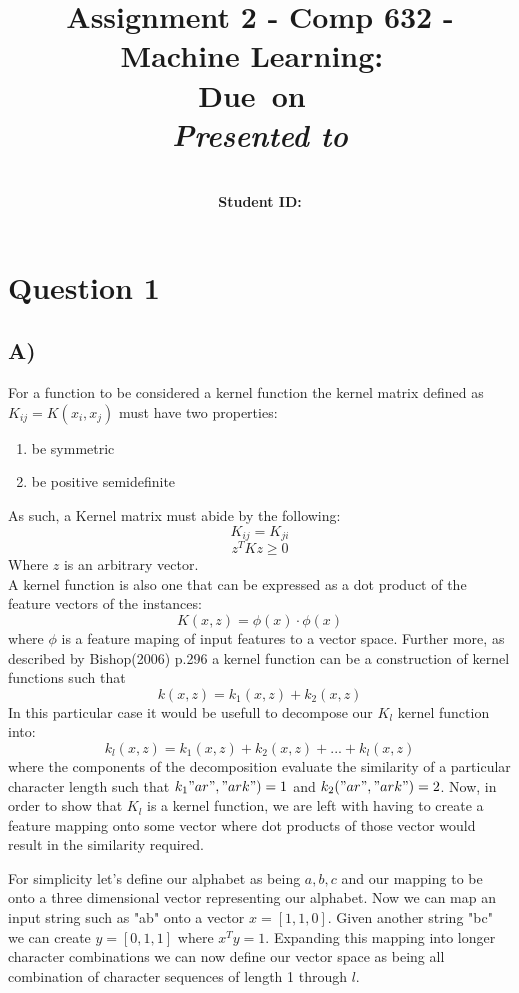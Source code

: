 \documentclass{report}
\title{Assignment 2 - Comp 632 - Machine Learning}
\title{\vspace{2in}\textmd{\textbf{\hmwkClass:\ \hmwkTitle}}\\
\normalsize\vspace{0.1in}\small{Due\ on\ \hmwkDueDate}\\
\vspace{0.1in}\large{\textit{Presented to \hmwkClassInstructor}}\vspace{3in}}
\date{}
\author{\textbf{\hmwkAuthorName}\\
    \textbf{Student ID: \hmwkAuthorNumber}}
\begin{document}
\maketitle
\section*{Question 1}
\subsection*{A)}
For a function to be considered a kernel function the kernel matrix defined as
$K_{ij}=K(x_i,x_j)$ must have two properties:
\begin{enumerate}
  \item be symmetric
  \item be positive semidefinite
\end{enumerate}
As such, a Kernel matrix must abide by the following:
\begin{equation}
  K_{ij} = K_{ji}
\end{equation}
\begin{equation}
  z^{T}Kz\geq 0
\end{equation}
Where $z$ is an arbitrary vector. \\

A kernel function is also one that can be expressed as a dot product of the feature
vectors of the instances:
\begin{equation}
  K(x,z) = \phi (x) \cdot \phi (x)
\end{equation}
where $\phi$ is a feature maping of input features to a vector space. Further more,
as described by Bishop(2006) p.296 a kernel function can be a construction of kernel
functions such that
\begin{equation}
  k(x,z) = k_1(x,z) + k_2(x,z)
\end{equation}
In this particular case it would be usefull to decompose our $K_l$ kernel function
into:
\begin{equation}
  k_l(x,z) = k_1(x,z) + k_2(x,z) + ... + k_l(x,z)
\end{equation}
where the components of the decomposition evaluate the similarity of a particular
character length such that $k_1"ar","ark")=1$ and $k_2("ar","ark")=2$. Now, in order
to show that $K_l$ is a kernel function, we are left with having to create a feature
mapping onto some vector where dot products of those vector would result in the
similarity required.

For simplicity let's define our alphabet as being ${a,b,c}$
and our mapping to be onto a three dimensional vector representing our alphabet.
Now we can map an input string such as "ab" onto a vector $x=[1,1,0]$. Given another
string "bc" we can create $y=[0,1,1]$ where $x^Ty=1$. Expanding this mapping into
longer character combinations we can now define our vector space as being all combination
of character sequences of length 1 through $l$.
\end{document}
